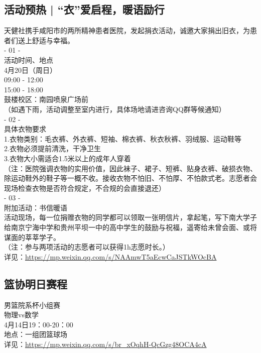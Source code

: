 \documentclass[letterpaper, 12pt]{article}
\begin{document}
\begin{multicols}{2}
\subsection{活动预热 | “衣”爱启程，暖语励行}
天健社携手咸阳市的两所精神患者医院，发起捐衣活动，诚邀大家捐出旧衣，为患者们送上舒适与幸福。
\\- 01 -
\\活动时间、地点 
\\4月20日（周日）
\\09:00 - 12:00
\\15:00 - 18:00
\\鼓楼校区：南园喷泉广场前
\\（如遇下雨，活动调整至室内进行，具体场地请进咨询QQ群等候通知）
\\- 02 -
\\具体衣物要求
\\1.衣物类别：毛衣裤、外衣裤、短袖、棉衣裤、秋衣秋裤、羽绒服、运动鞋等
\\2.衣物必须提前清洗，干净卫生
\\3.衣物大小需适合1.5米以上的成年人穿着
\\（注：医院强调衣物的实用价值，因此袜子、裙子、短裤、贴身衣裤、破损衣物、除运动鞋外的鞋子等一概不收。接收衣物不怕旧、不怕厚、不怕款式老。志愿者会现场检查衣物是否符合规定，不合规的会直接退还）
\\- 03 -
\\附加活动：书信暖语
\\活动现场，每一位捐赠衣物的同学都可以领取一张明信片，拿起笔，写下南大学子给南京宁海中学和贵州平坝一中的高中学生的鼓励与祝福，遥寄给未曾会面、或将谋面的莘莘学子。
\\（注：参与两项活动的志愿者可以获得1h志愿时长。）
\\详见：\url{https://mp.weixin.qq.com/s/NAAmwT5aEcwCaJSTkWOcBA}

\subsection{篮协明日赛程}
男篮院系杯小组赛
\\物理vs数学 
\\4月14日19：00-20：00
\\地点：一组团篮球场
\\详见：\url{https://mp.weixin.qq.com/s/br_xOqhH-QcGzg48OCA4cA}
\end{multicols}
\end{document}
